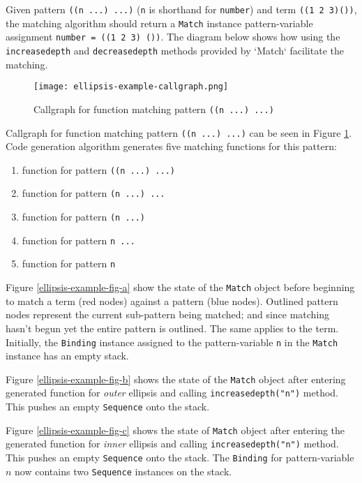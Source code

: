 
Given pattern \texttt{((n ...) ...)} (\texttt{n} is shorthand for \texttt{number}) and term \texttt{((1 2 3)())}, the matching algorithm should return a \texttt{Match} instance pattern-variable assignment \texttt{number = ((1 2 3) ())}. The diagram below shows how using the \texttt{increasedepth} and \texttt{decreasedepth} methods provided by `Match` facilitate the matching.

\begin{figure}[h]
\texttt{[image: ellipsis-example-callgraph.png]}
\caption{Callgraph for function matching pattern \texttt{((n ...) ...)}}
\label{ellipsis-example-callgraph}
\end{figure}

Callgraph for function matching pattern \texttt{((n ...) ...)} can be seen in Figure \ref{ellipsis-example-callgraph}. Code generation algorithm generates five matching functions for this pattern:

\begin{enumerate}
\item function for pattern \texttt{((n ...) ...)}
\item function for pattern \texttt{(n ...) ...}
\item function for pattern \texttt{(n ...) }
\item function for pattern \texttt{n ... }
\item function for pattern \texttt{n}
\end{enumerate}

Figure \ref{ellipsis-example-fig-a} show the state of the \texttt{Match} object before beginning to match a term (red nodes) against a pattern (blue nodes). Outlined pattern nodes represent the current sub-pattern being matched; and since matching hasn't begun yet the entire pattern is outlined. The same applies to the term. Initially, the \texttt{Binding} instance assigned to the pattern-variable \texttt{n} in the \texttt{Match} instance has an empty stack.

Figure \ref{ellipsis-example-fig-b} shows the state of the \texttt{Match} object after entering generated function for \textit{outer} ellipsis and calling \texttt{increasedepth("n")} method. This pushes an empty \texttt{Sequence} onto the stack.


Figure \ref{ellipsis-example-fig-c} shows the state of \texttt{Match} object after entering the generated function for \textit{inner} ellipsis and calling \texttt{increasedepth("n")} method. This pushes an empty \texttt{Sequence} onto the stack. The \texttt{Binding} for pattern-variable $n$ now contains two \texttt{Sequence} instances on the stack.

